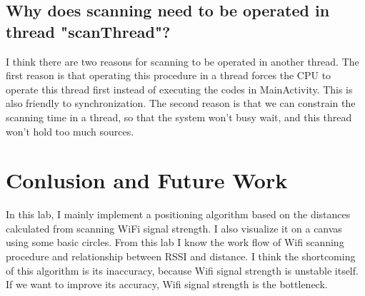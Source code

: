 \documentclass{article}
\begin{document}
\subsection{Why does scanning need to be operated in thread "scanThread"?}
I think there are two reasons for scanning to be operated in another thread. The first reason is that operating this procedure in a thread forces the CPU to operate this thread first instead of executing the codes in MainActivity. This is also friendly to synchronization. The second reason is that we can constrain the scanning time in a thread, so that the system won't busy wait, and this thread won't hold too much sources.

\section{Conlusion and Future Work}
In this lab, I mainly implement a positioning algorithm based on the distances calculated from scanning WiFi signal strength. I also visualize it on a canvas using some basic circles. From this lab I know the work flow of Wifi scanning procedure and relationship between RSSI and distance. I think the shortcoming of this algorithm is its inaccuracy, because Wifi signal strength is unstable itself. If we want to improve its accuracy, Wifi signal strength is the bottleneck.
\end{document}
